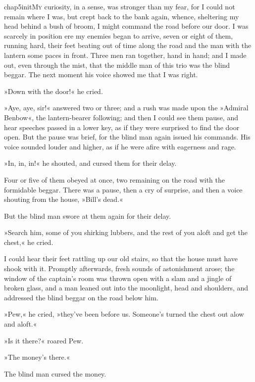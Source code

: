 
\lettrine[lines=5,image=true,findent=2pt]{chap5initM}{y} curiosity, in a sense, was stronger than my fear, for I could not remain where I was, but crept back to the bank again, whence, sheltering my head behind a bush of broom, I might command the road before our door. I was scarcely in position ere my enemies began to arrive, seven or eight of them, running hard, their feet beating out of time along the road and the man with the lantern some paces in front. Three men ran together, hand in hand; and I made out, even through the mist, that the middle man of this trio was the blind beggar. The next moment his voice showed me that I was right.

»Down with the door!« he cried.

»Aye, aye, sir!« answered two or three; and a rush was made upon the »Admiral Benbow«, the lantern-bearer following; and then I could see them pause, and hear speeches passed in a lower key, as if they were surprised to find the door open. But the pause was brief, for the blind man again issued his commands. His voice sounded louder and higher, as if he were afire with eagerness and rage.

»In, in, in!« he shouted, and cursed them for their delay.

Four or five of them obeyed at once, two remaining on the road with the formidable beggar. There was a pause, then a cry of surprise, and then a voice shouting from the house, »Bill's dead.«

But the blind man swore at them again for their delay.

»Search him, some of you shirking lubbers, and the rest of you aloft and get the chest,« he cried.

I could hear their feet rattling up our old stairs, so that the house must have shook with it. Promptly afterwards, fresh sounds of astonishment arose; the window of the captain's room was thrown open with a slam and a jingle of broken glass, and a man leaned out into the moonlight, head and shoulders, and addressed the blind beggar on the road below him.

»Pew,« he cried, »they've been before us. Someone's turned the chest out alow and aloft.«

»Is it there?« roared Pew.

»The money's there.«

The blind man cursed the money.

